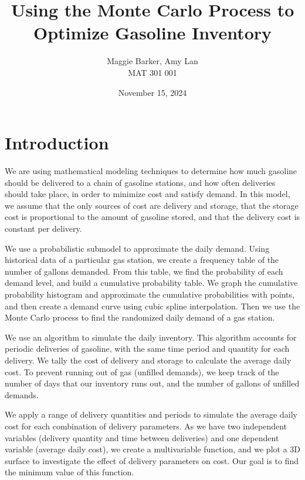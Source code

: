 \documentclass{article}
\title{Using the Monte Carlo Process to Optimize Gasoline Inventory}
\date{November 15, 2024}
\author{Maggie Barker, Amy Lan\\MAT 301 001}
\begin{document}
    \maketitle
    \section*{Introduction}
    We are using mathematical modeling techniques to determine how much gasoline should be delivered to a chain of gasoline stations, and how often deliveries should take place, in order to minimize cost and satisfy demand. In this model, we assume that the only sources of cost are delivery and storage, that the storage cost is proportional to the amount of gasoline stored, and that the delivery cost is constant per delivery.

    We use a probabilistic submodel to approximate the daily demand. Using historical data of a particular gas station, we create a frequency table of the number of gallons demanded. From this table, we find the probability of each demand level, and build a cumulative probability table. We graph the cumulative probability histogram and approximate the cumulative probabilities with points, and then create a demand curve using cubic spline interpolation. Then we use the Monte Carlo process to find the randomized daily demand of a gas station.

    We use an algorithm to simulate the daily inventory. This algorithm accounts for periodic deliveries of gasoline, with the same time period and quantity for each delivery. We tally the cost of delivery and storage to calculate the average daily cost. To prevent running out of gas (unfilled demands), we keep track of the number of days that our inventory runs out, and the number of gallons of unfilled demands.

    We apply a range of delivery quantities and periods to simulate the average daily cost for each combination of delivery parameters. As we have two independent variables (delivery quantity and time between deliveries) and one dependent variable (average daily cost), we create a multivariable function, and we plot a 3D surface to investigate the effect of delivery parameters on cost. Our goal is to find the minimum value of this function.
\end{document}
